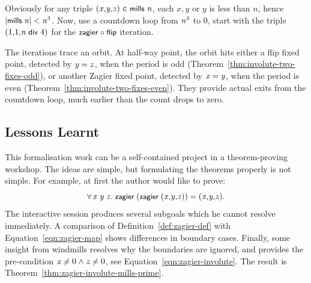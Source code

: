\documentclass[sigplan,screen]{acmart}
\renewcommand{\HOLinline}[1]{\ensuremath{#1}} %
\renewcommand{\HOLConst}[1]{{\fontsize{9pt}{1em}\selectfont\textsf{\upshape #1}}}
\renewcommand{\HOLNumLit}[1]{{\selectfont\textrm{\upshape #1}}} %
\renewcommand{\HOLSymConst}[1]{{\fontsize{9pt}{1em}\selectfont\textsf{\upshape #1}}}
\begin{document}
Obviously for any triple \HOLinline{(\HOLFreeVar{x}\HOLSymConst{,}\HOLFreeVar{y}\HOLSymConst{,}\HOLFreeVar{z})\;\HOLSymConst{\HOLTokenIn{}}\;\HOLConst{mills}\;\HOLFreeVar{n}}, each $x, y$ or $y$ is less than $n$, hence \HOLinline{\ensuremath{|}\HOLConst{mills}\;\HOLFreeVar{n}\ensuremath{|}\;\HOLSymConst{\HOLTokenLt{}}\;\HOLFreeVar{n}\HOLSymConst{\ensuremath{\sp{3}}}}.
Now, use a countdown loop from \HOLinline{\HOLFreeVar{n}\HOLSymConst{\ensuremath{\sp{3}}}} to $0$, start with the triple \HOLinline{(\HOLNumLit{1}\HOLSymConst{,}\HOLNumLit{1}\HOLSymConst{,}\HOLFreeVar{n}\;\HOLConst{\HOLConst{div}}\;\HOLNumLit{4})} for the \HOLinline{\HOLConst{zagier}\;\HOLSymConst{\HOLTokenCompose}\;\HOLConst{flip}} iteration. 

The iterations trace an orbit. At half-way point, the orbit hits either a flip fixed point, detected by \HOLinline{\HOLFreeVar{y}\;\HOLSymConst{=}\;\HOLFreeVar{z}}, when the period is odd (Theorem~\ref{thm:involute-two-fixes-odd}), or another Zagier fixed point, detected by \HOLinline{\HOLFreeVar{x}\;\HOLSymConst{=}\;\HOLFreeVar{y}}, when the period is even (Theorem~\ref{thm:involute-two-fixes-even}). They provide actual exits from the countdown loop, much earlier than the count drops to zero.

\subsection{Lessons Learnt}
\label{sec:lessons}
This formalisation work can be a self-contained project in a theorem-proving workshop.
The ideas are simple, but formulating the theorems properly is not simple.
For example, at first the author would like to prove:
\begin{equation*}
\label{eqn:zagier-inv}
\HOLinline{\HOLSymConst{\HOLTokenForall{}}\HOLBoundVar{x}\;\HOLBoundVar{y}\;\HOLBoundVar{z}.\;\HOLConst{zagier}\;(\HOLConst{zagier}\;(\HOLBoundVar{x}\HOLSymConst{,}\HOLBoundVar{y}\HOLSymConst{,}\HOLBoundVar{z}))\;\HOLSymConst{=}\;(\HOLBoundVar{x}\HOLSymConst{,}\HOLBoundVar{y}\HOLSymConst{,}\HOLBoundVar{z})}.
\end{equation*}
The interactive session produces several subgoals which he cannot resolve immediately.
A comparison of Definition~\ref{def:zagier-def} with Equation~\eqref{eqn:zagier-map}
shows differences in boundary cases.
Finally, some insight from windmills resolves why the boundaries are ignored, and provides the pre-condition \HOLinline{\HOLFreeVar{x}\;\HOLSymConst{\HOLTokenNotEqual{}}\;\HOLNumLit{0}\;\HOLSymConst{\HOLTokenConj{}}\;\HOLFreeVar{z}\;\HOLSymConst{\HOLTokenNotEqual{}}\;\HOLNumLit{0}}, see Equation~\eqref{eqn:zagier-involute}. The result is Theorem~\ref{thm:zagier-involute-mills-prime}.
\end{document}
